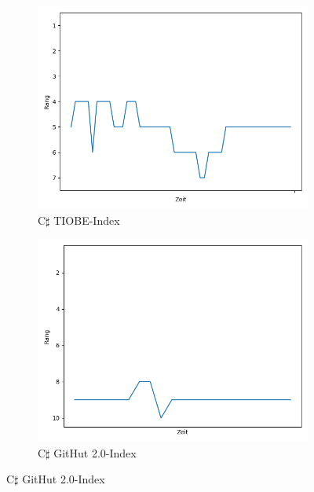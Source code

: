 \documentclass[ngerman]{article}
\begin{document}
    \begin{figure}[h!]
        \begin{subfigure}[h!]{.5\textwidth}
            \caption{C$\sharp$ TIOBE-Index}
            \centering
            \includegraphics[scale=.25]{CSharpTIOBE.png}
        \end{subfigure}
        \begin{subfigure}[h!]{.5\textwidth}
            \caption{C$\sharp$ GitHut 2.0-Index}
            \centering
            \includegraphics[scale=.25]{CSharpGitHut.png}
        \end{subfigure}
    \end{figure}\\\\
\end{document}
